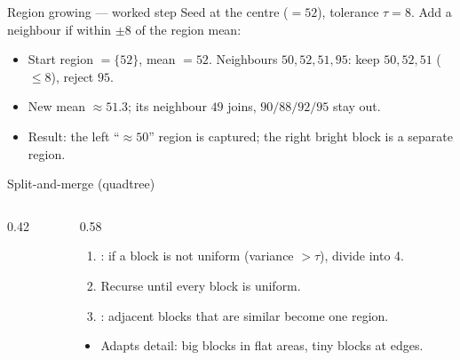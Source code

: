 \documentclass[10pt,aspectratio=169]{beamer}
\begin{document}
\begin{frame}{Region growing --- worked step}
  Seed at the centre ($=52$), tolerance $\tau=8$. Add a neighbour if within $\pm8$ of the region mean:
  \begin{center}
  \end{center}
  \begin{itemize}
    \item Start region $=\{52\}$, mean $=52$. Neighbours $50,52,51,95$: keep $50,52,51$ ($\le\!8$), reject $95$.
    \item New mean $\approx 51.3$; its neighbour $49$ joins, $90/88/92/95$ stay out.
    \item Result: the left ``$\approx50$'' region is captured; the right bright block is a separate region.
  \end{itemize}
\end{frame}

\begin{frame}{Split-and-merge (quadtree)}
  \begin{columns}[T]
    \begin{column}{0.42\textwidth}
    \end{column}
    \begin{column}{0.58\textwidth}
      \begin{enumerate}
        \item {}: if a block is not uniform (variance $>\tau$), divide into 4.
        \item Recurse until every block is uniform.
        \item {}: adjacent blocks that are similar become one region.
      \end{enumerate}
      \begin{itemize}
        \item Adapts detail: big blocks in flat areas, tiny blocks at edges.
      \end{itemize}
    \end{column}
  \end{columns}
\end{frame}
\end{document}
